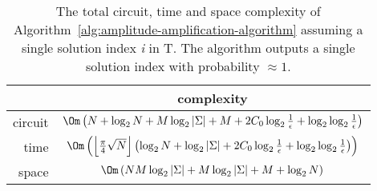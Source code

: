 \begin{table}[h!]
	\centering
	\begin{tabular}{| r || c |}
		\hline
		\quad            & complexity \\
		\hline\hline
		circuit           & $\Om\left( N + \log_2 N + M\log_2\vert \Sigma \vert + M + 2C_0\log_2\frac{1}{\epsilon} + \log_2\log_2\frac{1}{\epsilon}\right)$ \\
		\hline
		time             & $\Om\left( \left\lfloor \frac{\pi}{4}\sqrt{N} \right\rfloor \left( \log_2 N + \log_2 \vert \Sigma \vert + 2C_0\log_2\frac{1}{\epsilon} + \log_2\log_2\frac{1}{\epsilon} \right) \right)$ \\
		\hline
		space           & $\Om\left( NM\log_2\vert \Sigma \vert + M\log_2 \vert \Sigma \vert + M + \log_2 N \right)$\\
		\hline
	\end{tabular}
	\caption{The total circuit, time and space complexity of Algorithm~\ref{alg:amplitude-amplification-algorithm} assuming a single solution index \textit{i} in T. The algorithm outputs a single solution index with probability $\approx 1$.}
	\label{tab:conclusion-amplitude-amplification-based-algorithm-complexities}
\end{table}

